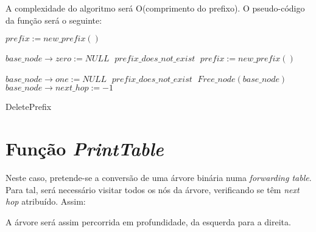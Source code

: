 \documentclass[twocolumn]{article}
\begin{document}
A complexidade do algoritmo será O(comprimento do prefixo). %
O pseudo-código da função será o seguinte:
\begin{algorithmic}
 	\;
 \EndIf
 		\State $prefix:=new\_prefix()\;$
 		
 				\State $base\_node \rightarrow zero:=NULL\;$
 			\EndIf
 		\Else
 			\State $prefix\_does\_not\_exist\;$
 			\;
 		\EndIf
 	\Else
 			\State $prefix:=new\_prefix()\;$
 		
 					\State $base\_node \rightarrow one:=NULL\;$
 				\EndIf
 			\Else
 				\State $prefix\_does\_not\_exist\;$
 				\;
 			\EndIf
 		\EndIf
 	\EndIf
 \Else
 		\State $Free\_node(base\_node)\;$
 		\;
 	\Else
		\State $base\_node \rightarrow next\_hop:=-1\;$	
 	\EndIf
 \EndIf
 \;
 \caption{DeletePrefix}
\end{algorithmic}
\section{Função \textit{PrintTable}}
Neste caso, pretende-se a conversão de uma árvore binária numa \textit{forwarding table}. Para tal, será necessário visitar todos os nós da árvore, verificando se têm \textit{next hop} atribuído. Assim:

\begin{algorithmic}
 \If{$node\_has\_next\_hop$}{
	\State $print\_prefix\_and\_next\_hop\;$
 \EndIf
 \If{$has\_"0"\_child$}
 	\State $update\_prefix$
 	
	\State $PrintTable(zero\_child,prefix)\;$
 \EndIf
 \If{$has\_"1"\_child$}
 	\State $update\_prefix$
 	
	\State $PrintTable(one\_child,prefix)\;$
 \EndIf
 
 \Return\;
 \caption{PrintTable}
\end{algorithmic}
A árvore será assim percorrida em profundidade, da esquerda para a direita.
\end{document}
